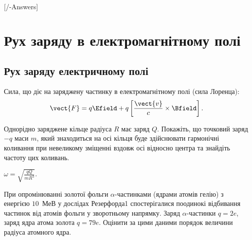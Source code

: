 
[\currfilebase/\currfilebase-Answers]
\chapter{Рух заряду в електромагнітному полі}\label{\currfilebase}

\section{Рух заряду електричному полі}

\begin{Theory}\small
Сила, що діє на заряджену частинку в електромагнітному полі (сила Лоренца):
	\begin{equation}
		\vect{F} = q\Efield + q\left[ \frac{\vect{v}}{c} \times \Bfield\right].
	\end{equation}
\end{Theory}

\begin{problem}
Однорідно заряджене кільце радіуса $R$ має заряд $Q$. Покажіть, що точковий заряд $-q$ маси $m$, який знаходиться на осі кільця буде здійснювати гармонічні коливання при невеликому зміщенні вздовж осі відносно центра та знайдіть частоту цих коливань.
\begin{solution}
	$\omega = \sqrt{\frac{qQ}{mR^3}}$.
\end{solution}
\end{problem}

\begin{problem}%
    При опромінюванні золотої фольги $\alpha$-частинками (ядрами атомів гелію) з
    енергією $10$~МеВ у дослідах Резерфорда1 спостерігалися поодинокі відбивання частинок від атомів фольги у зворотньому напрямку. Заряд $\alpha$-частинки $q = 2e$, заряд ядра атома золота $q = 79e$. Оцінити за цими даними порядок величини радіуса атомного ядра.
\end{problem}

